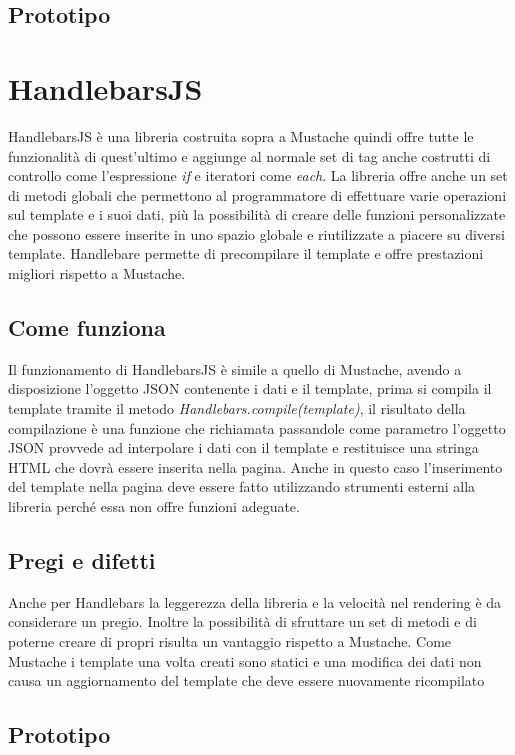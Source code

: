 \subsection{Prototipo}


\FloatBarrier
\section{HandlebarsJS}
HandlebarsJS è una libreria costruita sopra a Mustache quindi offre tutte le funzionalità di quest'ultimo e aggiunge al normale set di tag anche costrutti di controllo come l'espressione \textit{if} e iteratori come \textit{each}.
La libreria offre anche un set di metodi globali che permettono al programmatore di effettuare varie operazioni sul template e i suoi dati, più la possibilità di creare delle funzioni personalizzate che possono essere inserite in uno spazio globale e riutilizzate a piacere su diversi template.
Handlebare permette di precompilare il template e offre prestazioni migliori rispetto a Mustache.
\subsection{Come funziona}
Il funzionamento di HandlebarsJS è simile a quello di Mustache, avendo a disposizione l'oggetto JSON contenente i dati e il template, prima si compila il template tramite il metodo \textit{Handlebars.compile(template)}, il risultato della compilazione è una funzione che richiamata passandole come parametro l'oggetto JSON provvede ad interpolare i dati con il template e restituisce una stringa HTML che dovrà essere inserita nella pagina.
Anche in questo caso l'inserimento del template nella pagina deve essere fatto utilizzando strumenti esterni alla libreria perché essa non offre funzioni adeguate.

\subsection{Pregi e difetti}
Anche per Handlebars la leggerezza della libreria e la velocità nel rendering è da considerare un pregio.
Inoltre la possibilità di sfruttare un set di metodi e di poterne creare di propri risulta un vantaggio rispetto a Mustache.
Come Mustache i template una volta creati sono statici e una modifica dei dati non causa un aggiornamento del template che deve essere nuovamente ricompilato
\subsection{Prototipo}


